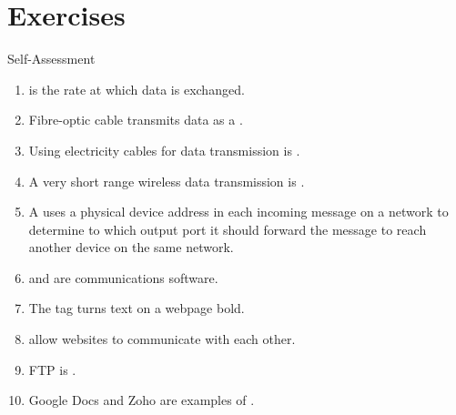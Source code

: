 \documentclass[\main/notes.tex]{subfiles}
\begin{document}
		\section{Exercises}
			\begin{exercise}{Self-Assessment}
				\begin{enumerate}
					\item {} is the rate at which data is exchanged.
					\item Fibre-optic cable transmits data as a .
					\item Using electricity cables for data transmission is .
					\item A very short range wireless data transmission is .
					\item A  uses a physical device address in each incoming message on a network to determine to which output port it should forward the message to reach another device on the same network.
					\item {} and  are communications software.
					\item The  tag turns text on a webpage bold.
					\item {} allow websites to communicate with each other.
					\item FTP is .
					\item Google Docs and Zoho are examples of .
				\end{enumerate}
			\end{exercise}

	\vbox{}
\end{document}

